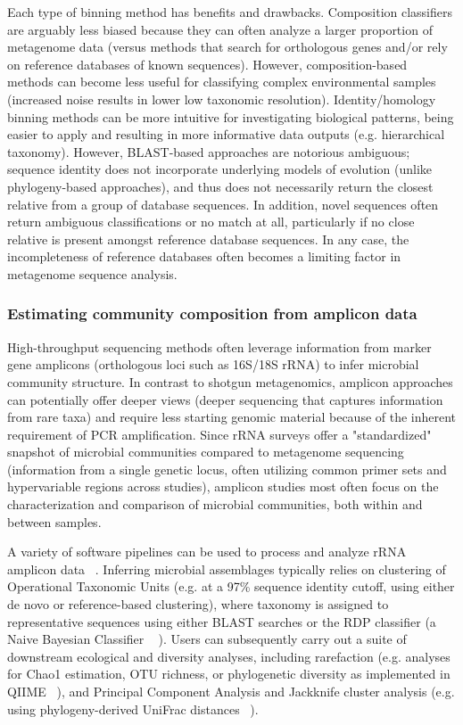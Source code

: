 \documentclass[10pt]{article}
\begin{document}
Each type of binning method has benefits and drawbacks. 
Composition classifiers are arguably less biased because they can often analyze a larger proportion of metagenome data (versus methods that search for orthologous genes and/or rely on reference databases of known sequences). 
However, composition-based methods can become less useful for classifying complex environmental samples (increased noise results in lower low taxonomic resolution). 
Identity/homology binning methods can be more intuitive for investigating biological patterns, being easier to apply and resulting in more informative data outputs (e.g. hierarchical taxonomy).  
However, BLAST-based approaches are notorious ambiguous; sequence identity does not incorporate underlying models of evolution (unlike phylogeny-based approaches), and thus does not necessarily return the closest relative from a group of database sequences. 
In addition, novel sequences often return ambiguous classifications or no match at all, particularly if no close relative is present amongst reference database sequences. 
In any case, the incompleteness of reference databases often becomes a limiting factor in metagenome sequence analysis. 

\subsubsection*{Estimating community composition from amplicon data}
High-throughput sequencing methods often leverage information from marker gene amplicons (orthologous loci such as 16S/18S rRNA) to infer microbial community structure. 
In contrast to shotgun metagenomics, amplicon approaches can potentially offer deeper views (deeper sequencing that captures information from rare taxa) and require less starting genomic material because of the inherent requirement of PCR amplification. 
Since rRNA surveys offer a  "standardized" snapshot of microbial communities compared to metagenome sequencing (information from a single genetic locus, often utilizing common primer sets and hypervariable regions across studies), amplicon studies most often focus on the characterization and comparison of microbial communities, both within and between samples. 

A variety of software pipelines can be used to process and analyze rRNA amplicon data ~\cite{Bik2012}. 
Inferring microbial assemblages typically relies on clustering of Operational Taxonomic Units (e.g. at a 97\% sequence identity cutoff, using either de novo or reference-based clustering), where taxonomy is assigned to representative sequences using either BLAST searches or the RDP classifier (a Naive Bayesian Classifier ~\cite{Wang2007} ).
Users can subsequently carry out a suite of downstream ecological and diversity analyses, including rarefaction (e.g. analyses for Chao1 estimation, OTU richness, or phylogenetic diversity as implemented in QIIME ~\cite{Caporaso2010}), and Principal Component Analysis and Jackknife cluster analysis (e.g. using phylogeny-derived UniFrac distances ~\cite{Lozupone2005}).
\end{document}
